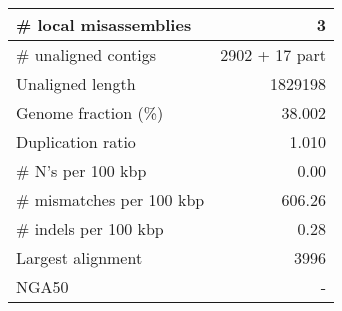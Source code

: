 \documentclass[12pt,a4paper]{article}
\begin{document}
\begin{table}[ht]
\begin{center}
\begin{tabular}{|l*{1}{|r}|}
\# local misassemblies & 3 \\ \hline
\# unaligned contigs & 2902 + 17 part \\ \hline
Unaligned length & 1829198 \\ \hline
Genome fraction (\%) & 38.002 \\ \hline
Duplication ratio & 1.010 \\ \hline
\# N's per 100 kbp & 0.00 \\ \hline
\# mismatches per 100 kbp & 606.26 \\ \hline
\# indels per 100 kbp & 0.28 \\ \hline
Largest alignment & 3996 \\ \hline
NGA50 & - \\ \hline
\end{tabular}
\end{center}
\end{table}
\end{document}
